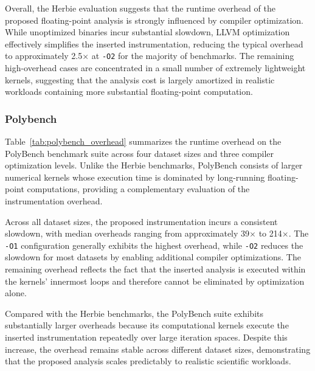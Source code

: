 

Overall, the Herbie evaluation suggests that the runtime overhead of the proposed floating-point analysis is strongly influenced by compiler optimization. While unoptimized binaries incur substantial slowdown, LLVM optimization effectively simplifies the inserted instrumentation, reducing the typical overhead to approximately 2.5$\times$ at \texttt{-O2} for the majority of benchmarks. The remaining high-overhead cases are concentrated in a small number of extremely lightweight kernels, suggesting that the analysis cost is largely amortized in realistic workloads containing more substantial floating-point computation.


\subsubsection{Polybench}
\label{sec:polybench_overhead}

Table~\ref{tab:polybench_overhead} summarizes the runtime overhead on the PolyBench benchmark suite across four dataset sizes and three compiler optimization levels. Unlike the Herbie benchmarks, PolyBench consists of larger numerical kernels whose execution time is dominated by long-running floating-point computations, providing a complementary evaluation of the instrumentation overhead.

Across all dataset sizes, the proposed instrumentation incurs a consistent slowdown, with median overheads ranging from approximately 39$\times$ to 214$\times$. The \texttt{-O1} configuration generally exhibits the highest overhead, while \texttt{-O2} reduces the slowdown for most datasets by enabling additional compiler optimizations. The remaining overhead reflects the fact that the inserted analysis is executed within the kernels' innermost loops and therefore cannot be eliminated by optimization alone.

Compared with the Herbie benchmarks, the PolyBench suite exhibits substantially larger overheads because its computational kernels execute the inserted instrumentation repeatedly over large iteration spaces. Despite this increase, the overhead remains stable across different dataset sizes, demonstrating that the proposed analysis scales predictably to realistic scientific workloads.



